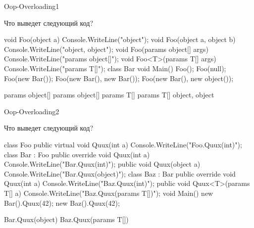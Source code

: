 \begin{defproblem}{Oop-Overloading1}
\begin{onlyproblem}
  Что выведет следующий код?
  \begin{source}
  void Foo(object a)
  {
    Console.WriteLine("object");
  }
  void Foo(object a, object b)
  {
    Console.WriteLine("object, object");
  }
  void Foo(params object[] args)
  {
    Console.WriteLine("params object[]");
  }
  void Foo<T>(params T[] args)
  {
    Console.WriteLine("params T[]");
  }
  class Bar { }
  void Main()
  {
    Foo();
    Foo(null);
    Foo(new Bar());
    Foo(new Bar(), new Bar());
    Foo(new Bar(), new object());
  }
  \end{source}
\end{onlyproblem}
\begin{onlysolution}
  \begin{source}
  params object[]
  params object[]
  params T[]
  params T[]
  object, object
  \end{source}
\end{onlysolution}
\end{defproblem}
\begin{defproblem}{Oop-Overloading2}
\begin{onlyproblem}
  Что выведет следующий код?
  \begin{source}
  class Foo
  {
    public virtual void Quux(int a)
    {
      Console.WriteLine("Foo.Quux(int)");
    }
  }
  class Bar : Foo
  {
    public override void Quux(int a)
    {
      Console.WriteLine("Bar.Quux(int)");
    }
    public void Quux(object a)
    {
      Console.WriteLine("Bar.Quux(object)");
    } 
  }
  class Baz : Bar
  {
    public override void Quux(int a)
    {
      Console.WriteLine("Baz.Quux(int)");
    }
    public void Quux<T>(params T[] a)
    {
      Console.WriteLine("Baz.Quux(params T[])");
    }
  }
  void Main()
  {
    new Bar().Quux(42);
    new Baz().Quux(42);
  }
  \end{source}
\end{onlyproblem}
\begin{onlysolution}
  \begin{source}
  Bar.Quux(object)
  Baz.Quux(params T[])
  \end{source}
\end{onlysolution}
\end{defproblem}
